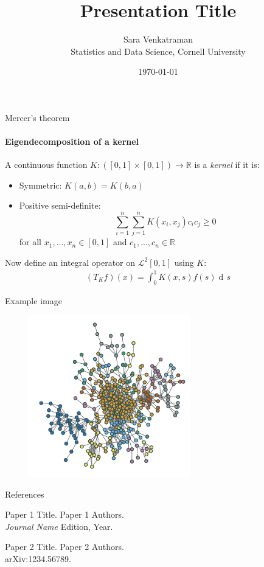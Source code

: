 \documentclass[handout]{beamer}
\newcommand{\R}{\mathbb{R}}		%
\newcommand{\El}{\mathcal{L}}	%
\newcommand{\1}{\mathds{1}}		%
\DeclareMathOperator*{\dv}{d\!}				%
\begin{document}

\title{Presentation Title}
\author{Sara Venkatraman\\
{\footnotesize Statistics and Data Science, Cornell University}}
\date{\today}

\begin{frame}
  \titlepage
\end{frame}


\begin{frame}{Mercer's theorem}
\framesubtitle{Eigendecomposition of a kernel}
A continuous function $K:([0,1]\times[0,1])\to\R$ is a \textit{kernel} if it is: \vspace{-0.4em}
\pause
\begin{itemize}
\item Symmetric: $K(a,b)=K(b,a)$\pause
\item Positive semi-definite: $$\sum_{i=1}^n\sum_{j=1}^nK(x_i,x_j)c_ic_j\geq 0$$ for all $x_1,...,x_n\in[0,1]$ and $c_1,...,c_n\in\R$
\end{itemize}
\pause 
Now define an integral operator on $\El^2[0,1]$ using $K$:
\begin{align*}
(T_Kf)(x) = \int_0^1K(x,s)f(s)\dv s
\end{align*}
\end{frame}

\begin{frame}{Example image}
\begin{figure}[H]
\centering\includegraphics[width=7cm]{ExampleImage}	
\end{figure}
\end{frame}


\begin{frame}{References}
\begin{thebibliography}{10}
\beamertemplatearticlebibitems
{\small

Paper 1 Title.
\newblock Paper 1 Authors. \\
{\it Journal Name} Edition, Year.

Paper 2 Title.
\newblock Paper 2 Authors.\\
arXiv:1234.56789.
}
\end{thebibliography}
\end{frame}

\end{document}
